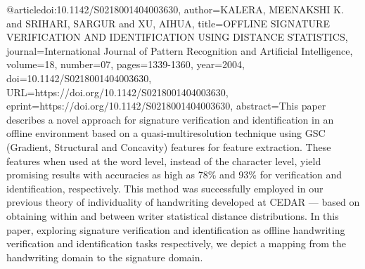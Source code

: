 @article{doi:10.1142/S0218001404003630,
  author={KALERA, MEENAKSHI K. and SRIHARI, SARGUR and XU, AIHUA},
  title={OFFLINE SIGNATURE VERIFICATION AND IDENTIFICATION USING DISTANCE STATISTICS},
  journal={International Journal of Pattern Recognition and Artificial Intelligence},
  volume={18},
  number={07},
  pages={1339-1360},
  year={2004},
  doi={10.1142/S0218001404003630},
  URL={https://doi.org/10.1142/S0218001404003630},
  eprint={https://doi.org/10.1142/S0218001404003630},
  abstract={This paper describes a novel approach for signature verification and identification in an offline environment based on a quasi-multiresolution technique using GSC (Gradient, Structural and Concavity) features for feature extraction. These features when used at the word level, instead of the character level, yield promising results with accuracies as high as 78\% and 93\% for verification and identification, respectively. This method was successfully employed in our previous theory of individuality of handwriting developed at CEDAR — based on obtaining within and between writer statistical distance distributions. In this paper, exploring signature verification and identification as offline handwriting verification and identification tasks respectively, we depict a mapping from the handwriting domain to the signature domain.}}